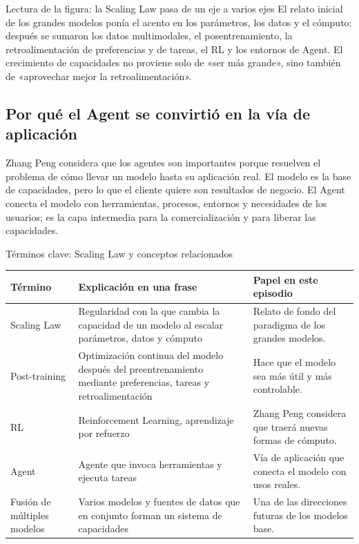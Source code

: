 \documentclass[a4paper]{article}
\begin{document}
\begin{knowledgebox}{Lectura de la figura: la Scaling Law pasa de un eje a varios ejes}
El relato inicial de los grandes modelos ponía el acento en los parámetros, los datos y el cómputo; después se sumaron los datos multimodales, el posentrenamiento, la retroalimentación de preferencias y de tareas, el RL y los entornos de Agent. El crecimiento de capacidades no proviene solo de «ser más grande», sino también de «aprovechar mejor la retroalimentación».
\end{knowledgebox}

\subsection{Por qué el Agent se convirtió en la vía de aplicación}

Zhang Peng considera que los agentes son importantes porque resuelven el problema de cómo llevar un modelo hasta su aplicación real. El modelo es la base de capacidades, pero lo que el cliente quiere son resultados de negocio. El Agent conecta el modelo con herramientas, procesos, entornos y necesidades de los usuarios; es la capa intermedia para la comercialización y para liberar las capacidades.

\begin{knowledgebox}{Términos clave: Scaling Law y conceptos relacionados}
\begin{tabularx}{\textwidth}{p{}p{}X}
\toprule
Término & Explicación en una frase & Papel en este episodio \\
\midrule
Scaling Law & Regularidad con la que cambia la capacidad de un modelo al escalar parámetros, datos y cómputo & Relato de fondo del paradigma de los grandes modelos. \\
Post-training & Optimización continua del modelo después del preentrenamiento mediante preferencias, tareas y retroalimentación & Hace que el modelo sea más útil y más controlable. \\
RL & Reinforcement Learning, aprendizaje por refuerzo & Zhang Peng considera que traerá nuevas formas de cómputo. \\
Agent & Agente que invoca herramientas y ejecuta tareas & Vía de aplicación que conecta el modelo con usos reales. \\
Fusión de múltiples modelos & Varios modelos y fuentes de datos que en conjunto forman un sistema de capacidades & Una de las direcciones futuras de los modelos base. \\
\bottomrule
\end{tabularx}
\end{knowledgebox}
\end{document}

